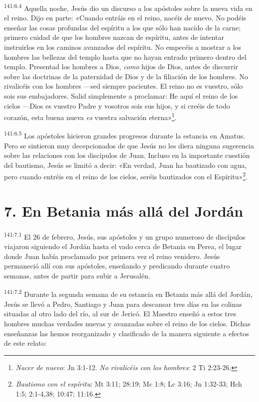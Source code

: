 \par
\textsuperscript{141:6.4} Aquella noche, Jesús dio un discurso a los apóstoles sobre la nueva vida en el reino. Dijo en parte: «Cuando entráis en el reino, nacéis de nuevo. No podéis enseñar las cosas profundas del espíritu a los que sólo han nacido de la carne; primero cuidad de que los hombres nazcan de espíritu, antes de intentar instruirlos en los caminos avanzados del espíritu. No empecéis a mostrar a los hombres las bellezas del templo hasta que no hayan entrado primero dentro del templo. Presentad los hombres a Dios, \textit{como} hijos de Dios, antes de discurrir sobre las doctrinas de la paternidad de Dios y de la filiación de los hombres. No rivalicéis con los hombres ---sed siempre pacientes. El reino no es vuestro, sólo sois sus embajadores. Salid simplemente a proclamar: He aquí el reino de los cielos ---Dios es vuestro Padre y vosotros sois sus hijos, y si creéis de todo corazón, esta buena nueva \textit{es} vuestra salvación eterna»\footnote{\textit{Nacer de nuevo}: Jn 3:1-12. \textit{No rivalicéis con los hombres}: 2 Ti 2:23-26.}.

\par
\textsuperscript{141:6.5} Los apóstoles hicieron grandes progresos durante la estancia en Amatus. Pero se sintieron muy decepcionados de que Jesús no les diera ninguna sugerencia sobre las relaciones con los discípulos de Juan. Incluso en la importante cuestión del bautismo, Jesús se limitó a decir: «En verdad, Juan ha bautizado con agua, pero cuando entréis en el reino de los cielos, seréis bautizados con el Espíritu»\footnote{\textit{Bautismo con el espíritu}: Mt 3:11; 28:19; Mc 1:8; Lc 3:16; Jn 1:32-33; Hch 1:5; 2:1-4,38; 10:47; 11:16.}.

\section*{7. En Betania más allá del Jordán}
\par
\textsuperscript{141:7.1} El 26 de febrero, Jesús, sus apóstoles y un grupo numeroso de discípulos viajaron siguiendo el Jordán hasta el vado cerca de Betania en Perea, el lugar donde Juan había proclamado por primera vez el reino venidero. Jesús permaneció allí con sus apóstoles, enseñando y predicando durante cuatro semanas, antes de partir para subir a Jerusalén.

\par
\textsuperscript{141:7.2} Durante la segunda semana de su estancia en Betania más allá del Jordán, Jesús se llevó a Pedro, Santiago y Juan para descansar tres días en las colinas situadas al otro lado del río, al sur de Jericó. El Maestro enseñó a estos tres hombres muchas verdades nuevas y avanzadas sobre el reino de los cielos. Dichas enseñanzas las hemos reorganizado y clasificado de la manera siguiente a efectos de este relato:

